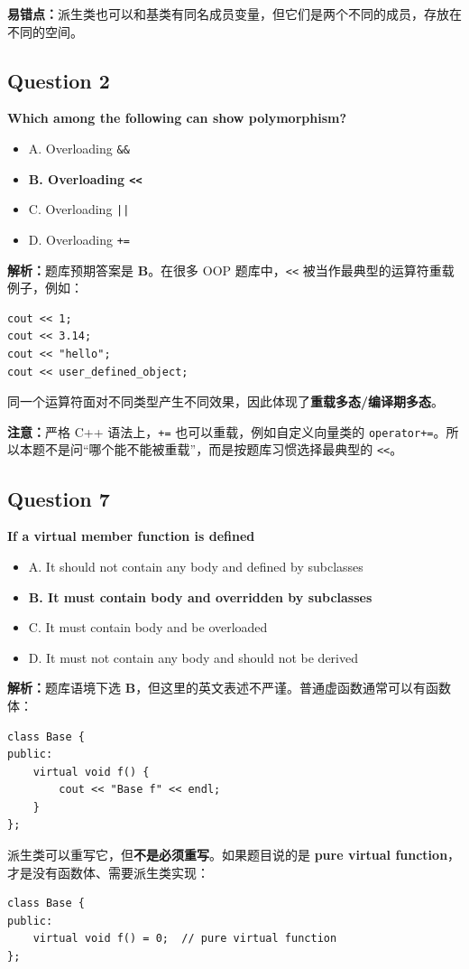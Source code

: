 \documentclass[11pt, a4paper]{article}
\begin{document}
\textbf{易错点：}派生类也可以和基类有同名成员变量，但它们是两个不同的成员，存放在不同的空间。


\subsection*{Question 2}
\textbf{Which among the following can show polymorphism?}
\begin{itemize}
    \item A. Overloading \texttt{\&\&}
    \item \textbf{B. Overloading \texttt{<<}}
    \item C. Overloading \texttt{||}
    \item D. Overloading \texttt{+=}
\end{itemize}

\textbf{解析：}题库预期答案是 \textbf{B}。在很多 OOP 题库中，\texttt{<<} 被当作最典型的运算符重载例子，例如：
\begin{lstlisting}
cout << 1;
cout << 3.14;
cout << "hello";
cout << user_defined_object;
\end{lstlisting}
同一个运算符面对不同类型产生不同效果，因此体现了\textbf{重载多态/编译期多态}。

\textbf{注意：}严格 C++ 语法上，\texttt{+=} 也可以重载，例如自定义向量类的 \texttt{operator+=}。所以本题不是问“哪个能不能被重载”，而是按题库习惯选择最典型的 \texttt{<<}。


\subsection*{Question 7}
\textbf{If a virtual member function is defined \underline{\hspace{2cm}}}
\begin{itemize}
    \item A. It should not contain any body and defined by subclasses
    \item \textbf{B. It must contain body and overridden by subclasses}
    \item C. It must contain body and be overloaded
    \item D. It must not contain any body and should not be derived
\end{itemize}

\textbf{解析：}题库语境下选 \textbf{B}，但这里的英文表述不严谨。普通虚函数通常可以有函数体：
\begin{lstlisting}
class Base {
public:
    virtual void f() {
        cout << "Base f" << endl;
    }
};
\end{lstlisting}
派生类可以重写它，但\textbf{不是必须重写}。如果题目说的是 \textbf{pure virtual function}，才是没有函数体、需要派生类实现：
\begin{lstlisting}
class Base {
public:
    virtual void f() = 0;  // pure virtual function
};
\end{lstlisting}
\end{document}
